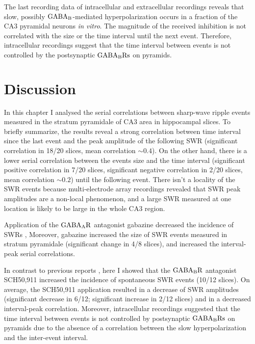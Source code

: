     The last recording data of intracellular and extracellular recordings
    reveals that slow, possibly $\rm GABA_B$-mediated hyperpolarization occurs
    in a fraction of the CA3 pyramidal neurons \textit{in vitro}. The magnitude
    of the received inhibition is not correlated with the size or the time
    interval until the next event. Therefore, intracellular recordings suggest
    that the time interval between events is not controlled by the postsynaptic
    $\rm GABA_B Rs$ on pyramids.
 

\section{Discussion}
  In this chapter I analysed the serial correlations between sharp-wave ripple
  events measured in the stratum pyramidale of CA3 area in hippocampal slices.
  To briefly summarize, the results reveal a strong correlation between time
  interval since the last event and the peak amplitude of the following SWR
  (significant correlation in 18/20 slices, mean correlation $\sim 0.4$). On
  the other hand, there is a lower serial correlation between the events size
  and the time interval (significant positive correlation in 7/20 slices,
  significant negative correlation in 2/20 slices, mean correlation $\sim 0.2$)
  until the following event. There isn't a locality of the SWR events because
  multi-electrode array recordings revealed that SWR peak amplitudes are a
  non-local phenomenon, and a large SWR measured at one location is likely to
  be large in the whole CA3 region. 
  
  Application of the $\rm GABA_AR$ antagonist gabazine decreased the incidence
  of SWRs \citep[in agreement with][]{Nimmrich2005}, Moreover, gabazine
  increased the size of SWR events measured in stratum pyramidale (significant
  change in 4/8 slices), and increased the interval-peak serial correlations. 

  In contrast to previous reports \citep[i.e.,][]{Hollnagel2014, Hofer2015},
  here I showed that the $\rm GABA_BR$ antagonist SCH50,911 increased the
  incidence of spontaneous SWR events (10/12 slices). On average, the SCH50,911
  application resulted in a decrease of SWR amplitudes (significant decrease in
  6/12; significant increase in 2/12 slices) and in a decreased interval-peak
  correlation. Moreover, intracellular recordings suggested that the time
  interval between events is not controlled by postsynaptic $\rm GABA_B Rs$ on
  pyramids due to the absence of a correlation between the slow
  hyperpolarization and the inter-event interval.

